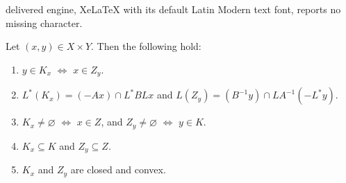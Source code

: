 \documentclass[10pt,a4paper]{amsart}
\providecommand{\siff}{\Leftrightarrow}
\begin{document}
delivered engine, XeLaTeX with its default Latin Modern text font, reports no missing character.
\begin{proposition}
\label{p:241120b}
Let $(x,y)\in X\times Y$. 
Then the following hold:
\begin{enumerate}
\item 
\label{p:241120b1}
$y\in K_x$ 
$\siff$ $x\in Z_y$. 
\item 
\label{p:241120b1.5}
$L^*(K_x) = (-Ax)\cap L^*BLx$ and 
$L(Z_y)= (B^{-1}y)\cap LA^{-1}(-L^*y)$.
\item 
\label{p:241120b2}
$K_x\neq\varnothing$
$\siff$ $x\in Z$, and
$Z_y\neq\varnothing$
$\siff$ $y\in K$.
\item 
\label{p:241120b3}
$K_x\subseteq K$ and 
$Z_y \subseteq Z$. 
\item 
\label{p:241120b4}
$K_x$ and $Z_y$ are closed and convex. 
\end{enumerate}
\end{proposition}
\end{document}
